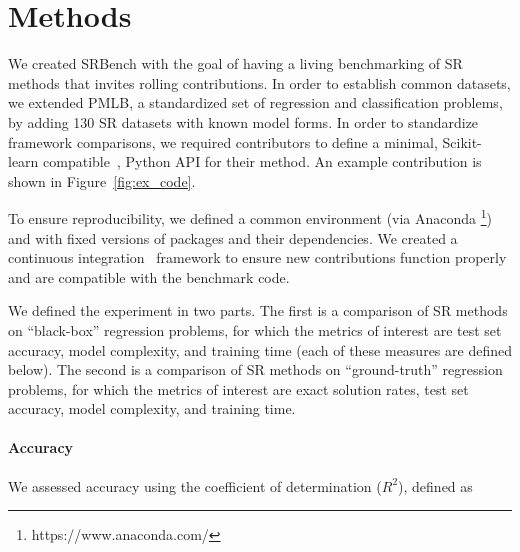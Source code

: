 



\section{Methods}

We created SRBench with the goal of having a living benchmarking of SR methods that invites rolling contributions. 
In order to establish common datasets, we extended PMLB, a standardized set of regression and classification problems\cite{olsonPMLBLargeBenchmark2017d}, by adding 130 SR datasets with known model forms. 
In order to standardize framework comparisons, we required contributors to define a minimal, Scikit-learn compatible~\cite{pedregosaScikitlearnMachineLearning2011a}, Python API for their method. 
An example contribution is shown in Figure~\ref{fig:ex_code}.

To ensure reproducibility, we defined a common environment (via Anaconda \footnote{https://www.anaconda.com/}) and with fixed versions of packages and their dependencies. 
We created a continuous integration~\cite{fowlerContinuousIntegration} framework to ensure new contributions function properly and are compatible with the benchmark code.  

We defined the experiment in two parts.
The first is a comparison of SR methods on ``black-box'' regression problems, for which the metrics of interest are test set accuracy, model complexity, and training time (each of these measures are defined below). 
The second is a comparison of SR methods on ``ground-truth'' regression problems, for which the metrics of interest are exact solution rates, test set accuracy, model complexity, and training time. 


\paragraph{Accuracy}
We assessed accuracy using the coefficient of determination ($R^2$), defined as 

